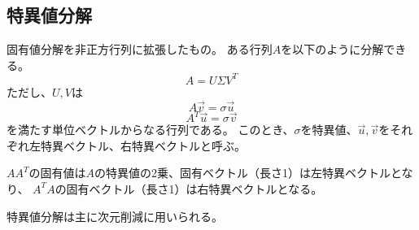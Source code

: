 \documentclass[b5paper,12pt]{jarticle}
\begin{document}
\subsection{特異値分解}
固有値分解を非正方行列に拡張したもの。
ある行列$A$を以下のように分解できる。
\[
    A=U\Sigma V^T
\]
ただし、$U,V$は
\[
    A\vec{v}=\sigma \vec{u}
\]
\[
    A^T\vec{u}=\sigma \vec{v}
\]
を満たす単位ベクトルからなる行列である。
このとき、$\sigma$を特異値、$\vec{u},\vec{v}$をそれぞれ左特異ベクトル、右特異ベクトルと呼ぶ。

$AA^T$の固有値は$A$の特異値の2乗、固有ベクトル（長さ1）は左特異ベクトルとなり、
$A^TA$の固有ベクトル（長さ1）は右特異ベクトルとなる。

特異値分解は主に次元削減に用いられる。
\end{document}
